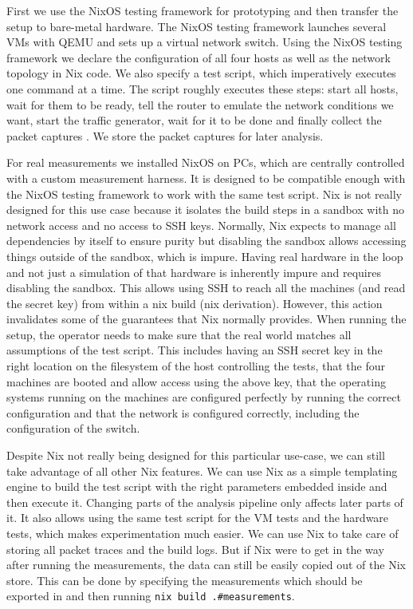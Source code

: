 First we use the NixOS testing framework for prototyping and then transfer the setup to bare-metal hardware.
The NixOS testing framework launches several VMs with QEMU and sets up a virtual network switch.
Using the NixOS testing framework we declare the configuration of all four hosts as well as the network topology in Nix code.
We also specify a test script, which imperatively executes one command at a time.
The script roughly executes these steps: start all hosts, wait for them to be ready, tell the router to emulate the network conditions we want, start the traffic generator, wait for it to be done and finally collect the packet captures .
We store the packet captures for later analysis.

For real measurements we installed NixOS on PCs, which are centrally controlled with a custom measurement harness.
It is designed to be compatible enough with the NixOS testing framework to work with the same test script.
Nix is not really designed for this use case because it isolates the build steps in a sandbox with no network access and no access to SSH keys.
Normally, Nix expects to manage all dependencies by itself to ensure purity but disabling the sandbox allows accessing things outside of the sandbox, which is impure.
Having real hardware in the loop and not just a simulation of that hardware is inherently impure and requires disabling the sandbox.
This allows using SSH to reach all the machines (and read the secret key) from within a nix build (nix derivation).
However, this action invalidates some of the guarantees that Nix normally provides.
When running the setup, the operator needs to make sure that the real world matches all assumptions of the test script.
This includes having an SSH secret key in the right location on the filesystem of the host controlling the tests, that the four machines are booted and allow access using the above key, that the operating systems running on the machines are configured perfectly by running the correct configuration and that the network is configured correctly, including the configuration of the switch.

Despite Nix not really being designed for this particular use-case, we can still take advantage of all other Nix features.
We can use Nix as a simple templating engine to build the test script with the right parameters embedded inside and then execute it.
Changing parts of the analysis pipeline only affects later parts of it. 
It also allows using the same test script for the VM tests and the hardware tests, which makes experimentation much easier.
We can use Nix to take care of storing all packet traces and the build logs.
But if Nix were to get in the way after running the measurements, the data can still be easily copied out of the Nix store.
This can be done by specifying the measurements which should be exported in  and then running \texttt{nix build .#measurements}.

